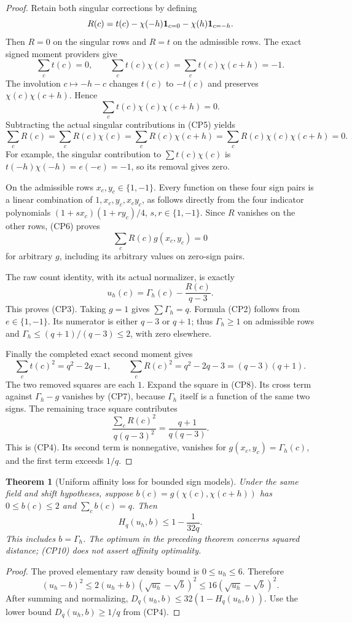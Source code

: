 \documentclass[11pt]{article}
\newtheorem{theorem}{Theorem}[section]
\begin{document}
\begin{proof}
Retain both singular corrections by defining
\[
 R(c)=t(c)-\chi(-h){\bf1}_{c=0}-\chi(h){\bf1}_{c=-h}.
\]
Then \(R=0\) on the singular rows and \(R=t\) on the admissible rows.
The exact signed moment providers give
\[
 \sum_ct(c)=0,\qquad
 \sum_ct(c)\chi(c)=\sum_ct(c)\chi(c+h)=-1.
 \tag{CP5}
\]
The involution \(c\mapsto-h-c\) changes \(t(c)\) to \(-t(c)\)
and preserves \(\chi(c)\chi(c+h)\). Hence
\[
                     \sum_ct(c)\chi(c)\chi(c+h)=0.
\]
Subtracting the actual singular contributions in (CP5) yields
\[
 \sum_cR(c)=\sum_cR(c)\chi(c)
 =\sum_cR(c)\chi(c+h)
 =\sum_cR(c)\chi(c)\chi(c+h)=0.
 \tag{CP6}
\]
For example, the singular contribution to \(\sum t(c)\chi(c)\)
is \(t(-h)\chi(-h)=e(-e)=-1\), so its removal gives zero.

On the admissible rows \(x_c,y_c\in\{1,-1\}\).
Every function on these four sign pairs is a linear combination of
\(1,x_c,y_c,x_cy_c\), as follows directly from the four indicator
polynomials \((1+s x_c)(1+r y_c)/4\), \(s,r\in\{1,-1\}\).
Since \(R\) vanishes on the other rows, (CP6) proves
\[
                         \sum_cR(c)g(x_c,y_c)=0
 \tag{CP7}
\]
for arbitrary \(g\), including its arbitrary values on zero-sign pairs.

The raw count identity, with its actual normalizer, is exactly
\[
                         u_h(c)=\Gamma_h(c)-\frac{R(c)}{q-3}.
 \tag{CP8}
\]
This proves (CP3). Taking \(g=1\) gives \(\sum\Gamma_h=q\).
Formula (CP2) follows from \(e\in\{1,-1\}\). Its numerator is
either \(q-3\) or \(q+1\); thus \(\Gamma_h\ge1\) on admissible
rows and \(\Gamma_h\le(q+1)/(q-3)\le2\), with zero elsewhere.

Finally the completed exact second moment gives
\[
 \sum_ct(c)^2=q^2-2q-1,\qquad
 \sum_cR(c)^2=q^2-2q-3=(q-3)(q+1).
 \tag{CP9}
\]
The two removed squares are each \(1\). Expand the square in (CP8).
Its cross term against \(\Gamma_h-g\) vanishes by (CP7), because
\(\Gamma_h\) itself is a function of the same two signs. The remaining
trace square contributes
\[
                 \frac{\sum_cR(c)^2}{q(q-3)^2}
                  =\frac{q+1}{q(q-3)}.
\]
This is (CP4). Its second term is nonnegative, vanishes for
\(g(x_c,y_c)=\Gamma_h(c)\), and the first term exceeds \(1/q\).
\end{proof}

\begin{theorem}[Uniform affinity loss for bounded sign models]
Under the same field and shift hypotheses, suppose
\(b(c)=g(\chi(c),\chi(c+h))\) has \(0\le b(c)\le2\) and
\(\sum_cb(c)=q\). Then
\[
                  H_q(u_h,b)\le1-\frac1{32q}.
 \tag{CP10}
\]
This includes \(b=\Gamma_h\). The optimum in the preceding theorem
concerns squared distance; (CP10) does not assert affinity optimality.
\end{theorem}
\begin{proof}
The proved elementary raw density bound is \(0\le u_h\le6\).
Therefore
\[
 (u_h-b)^2\le2(u_h+b)(\sqrt{u_h}-\sqrt b)^2
                 \le16(\sqrt{u_h}-\sqrt b)^2.
\]
After summing and normalizing,
\(D_q(u_h,b)\le32(1-H_q(u_h,b))\).
Use the lower bound \(D_q(u_h,b)\ge1/q\) from (CP4).
\end{proof}
\end{document}
